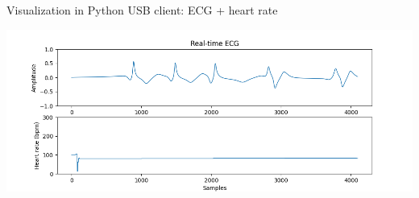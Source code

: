\begin{frame}{Visualization in Python USB client: ECG + heart rate}
\begin{minipage}[c][0.5\textheight][c]{\linewidth}
\begin{center}
    \includegraphics[width=\textwidth]{images/DAQ/daq_heart_rate.png} 
\end{center}
\end{minipage}
\end{frame}
